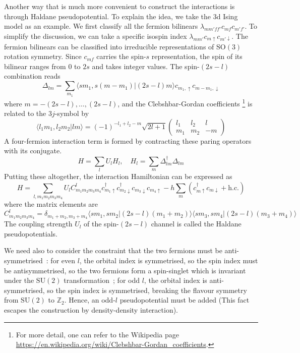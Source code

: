 \documentclass{timesjhep}
\begin{document}
Another way that is much more convenient to construct the interactions is through Haldane pseudopotential. To explain the idea, we take the 3d Ising model as an example. We first classify all the fermion bilinears $\lambda_{mm'ff'}c_{mf}c_{m'f'}$. To simplify the discussion, we can take a specific isospin index $\lambda_{mm'}c_{m\uparrow}c_{m'\downarrow}$. The fermion bilinears can be classified into irreducible representations of $\mathrm{SO}(3)$ rotation symmetry. Since $c_{mf}$ carries the spin-$s$ representation, the spin of its bilinear ranges from $0$ to $2s$ and takes integer values. The spin-$(2s-l)$ combination reads 
\begin{equation}
    \Delta_{lm}=\sum_{m_1}\langle sm_1,s(m-m_1)|(2s-l)m\rangle c_{m_1,\uparrow}c_{m-m_1,\downarrow}
\end{equation} 
where $m=-(2s-l),\dots,(2s-l)$, and the Clebshbar-Gordan coefficients \footnote{For more detail, one can refer to the Wikipedia page \url{https://en.wikipedia.org/wiki/Clebshbar-Gordan_coefficients}.} is related to the $3j$-symbol by
\begin{equation}
    \langle l_1m_1,l_2m_2|lm\rangle=(-1)^{-l_1+l_2-m}\sqrt{2l+1}\begin{pmatrix}l_1&l_2&l\\m_1&m_2&-m\end{pmatrix}
\end{equation}
A four-fermion interaction term is formed by contracting these paring operators with its conjugate. 
\begin{equation}
    H=\sum_lU_lH_l,\quad H_l=\sum_m\Delta_{lm}^\dagger\Delta_{lm} 
\end{equation} 
Putting these altogether, the interaction Hamiltonian can be expressed as 
\begin{equation}
    H=\sum_{l,m_1m_2m_3m_4}U_lC^l_{m_1m_2m_3m_4}c^\dagger_{m_1\uparrow}c^\dagger_{m_2\downarrow}c_{m_3\downarrow}c_{m_4\uparrow}-h\sum_m(c_{m\uparrow}^\dagger c_{m\downarrow}+\mathrm{h.c.}) 
\end{equation}
where the matrix elements are 
\begin{equation}
    C^l_{m_1m_2m_3m_4}=\delta_{m_1+m_2,m_3+m_4}\langle sm_1,sm_2|(2s-l)(m_1+m_2)\rangle\langle sm_3,sm_4|(2s-l)(m_3+m_4)\rangle 
    \label{eq:ps_pot_coeff}
\end{equation} 
The coupling strength $U_l$ of the spin-$(2s-l)$ channel is called the Haldane pseudopotentials. 

We need also to consider the constraint that the two fermions must be anti-symmetrised~: for even $l$, the orbital index is symmetrised, so the spin index must be antisymmetrised, so the two fermions form a spin-singlet which is invariant under the $\mathrm{SU}(2)$ transformation~; for odd $l$, the orbital index is anti-symmetrised, so the spin index is symmetrised, breaking the flavour symmetry from $\mathrm{SU}(2)$ to $\mathbb{Z}_2$. Hence, an odd-$l$ pseudopotential must be added (This fact escapes the construction by density-density interaction). 
\end{document}
